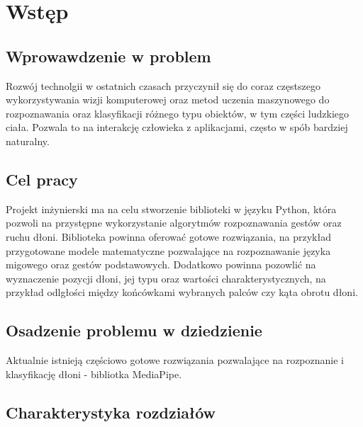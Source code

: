 \chapter{Wstęp}

\newpage

\section{Wprowawdzenie w problem}
\quad Rozwój technolgii w ostatnich czasach przyczynił się do coraz częstszego wykorzystywania wizji komputerowej oraz metod uczenia maszynowego do rozpoznawania oraz klasyfikacji różnego typu obiektów, w tym części ludzkiego ciała. Pozwala to na interakcję człowieka z aplikacjami, często w spób bardziej naturalny. 

\section{Cel pracy}
Projekt inżynierski ma na celu stworzenie biblioteki w języku Python, która pozwoli na przystępne wykorzystanie algorytmów rozpoznawania gestów oraz ruchu dłoni. Biblioteka powinna oferować gotowe rozwiązania, na przykład przygotowane modele matematyczne pozwalające na rozpoznawanie języka migowego oraz gestów podstawowych. Dodatkowo powinna pozowlić na wyznaczenie pozycji dłoni, jej typu oraz wartości charakterystycznych, na przykład odlgłości między końcówkami wybranych palców czy kąta obrotu dłoni. 

\section{Osadzenie problemu w dziedzienie}
\quad Aktualnie istnieją częściowo gotowe rozwiązania pozwalające na rozpoznanie i klasyfikację dłoni - bibliotka MediaPipe. 

\section {Charakterystyka rozdziałów}

